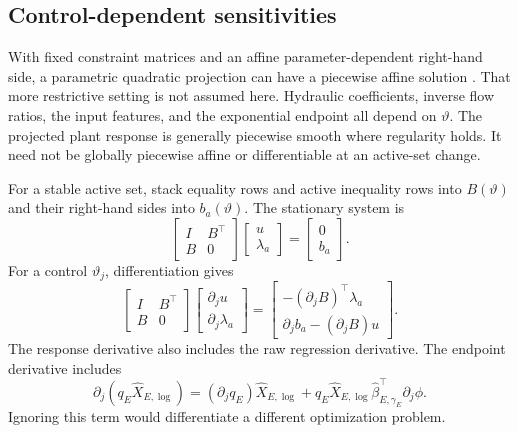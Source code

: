 \subsection{Control-dependent sensitivities}

With fixed constraint matrices and an affine parameter-dependent right-hand side, a parametric quadratic projection can have a piecewise affine solution \citep{Tondel2003}. That more restrictive setting is not assumed here. Hydraulic coefficients, inverse flow ratios, the input features, and the exponential endpoint all depend on $\vartheta$. The projected plant response is generally piecewise smooth where regularity holds. It need not be globally piecewise affine or differentiable at an active-set change.

For a stable active set, stack equality rows and active inequality rows into $B(\vartheta)$ and their right-hand sides into $b_a(\vartheta)$. The stationary system is
\begin{equation}
\begin{bmatrix}I&B^\top\\B&0\end{bmatrix}
\begin{bmatrix}u\\\lambda_a\end{bmatrix}
=\begin{bmatrix}0\\b_a\end{bmatrix}.
\label{eq:plant_active_system}
\end{equation}
For a control $\vartheta_j$, differentiation gives
\begin{equation}
\begin{bmatrix}I&B^\top\\B&0\end{bmatrix}
\begin{bmatrix}\partial_j u\\\partial_j\lambda_a\end{bmatrix}
=\begin{bmatrix}-(\partial_jB)^\top\lambda_a\\
\partial_jb_a-(\partial_jB)u\end{bmatrix}.
\label{eq:plant_active_sensitivity}
\end{equation}
The response derivative also includes the raw regression derivative. The endpoint derivative includes
\begin{equation}
\partial_j(q_E\widehat X_{E,\log})
=(\partial_jq_E)\widehat X_{E,\log}
+q_E\widehat X_{E,\log}\widehat\beta_{E,\gamma_E}^\top\partial_j\phi.
\end{equation}
Ignoring this term would differentiate a different optimization problem.

